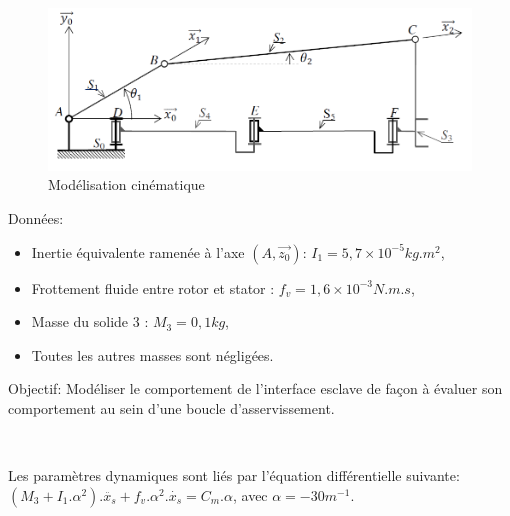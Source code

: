\begin{figure}[ht!]
\begin{center}
 \includegraphics[width=0.9\linewidth]{img/Figure11}
\end{center}
\caption{Modélisation cinématique}
\label{fig11}
\end{figure}

Données:
\begin{itemize}
 \item Inertie	équivalente	ramenée	à l'axe $(A,\overrightarrow{z_0})$: $I_1=5,7\times 10^{-5}kg.m^2$,
 \item Frottement fluide entre rotor et stator : $f_v = 1,6\times 10^{-3} N.m.s$,
 \item Masse du solide 3 : $M_3=0,1kg$,
 \item Toutes les autres masses sont négligées.
\end{itemize}

Objectif: Modéliser le comportement de l'interface esclave de façon à évaluer son comportement au sein d'une boucle d'asservissement.





~\

Les paramètres dynamiques sont liés par l'équation différentielle suivante: \\ $(M_3+I_1.\alpha^2).\ddot{x_s}+f_v.\alpha^2.\dot{x_s}=C_m.\alpha$, avec $\alpha=-30m^{-1}$.


